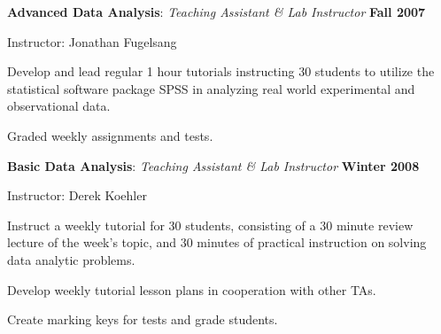 \documentclass[10pt]{article}
\newenvironment{outerlist}[1][\enskip\textbullet]%
        {\begin{enumerate}[#1]}{\end{enumerate}%
         \vspace{-.6\baselineskip}}
\newenvironment{innerlist}[1][\enskip\textbullet]%
        {\begin{compactenum}[#1]}{\end{compactenum}}
\begin{document}
\begin{outerlist}

\item[] \textbf{Advanced Data Analysis}: \textit{Teaching Assistant \& Lab Instructor}%
        \hfill \textbf{Fall 2007}
\begin{innerlist}
\item Instructor: Jonathan Fugelsang
\item Develop and lead regular 1 hour tutorials instructing 30 students to utilize the statistical software package SPSS in analyzing real world experimental and observational data.
\item Graded weekly assignments and tests.
\end{innerlist}

\item[] \textbf{Basic Data Analysis}: \textit{Teaching Assistant \& Lab Instructor}
        \hfill \textbf{Winter 2008}
\begin{innerlist}
\item Instructor: Derek Koehler
\item Instruct a weekly tutorial for 30 students, consisting of a 30 minute review lecture of the week's topic, and 30 minutes of practical instruction on solving data analytic problems.
\item Develop weekly tutorial lesson plans in cooperation with other TAs.
\item Create marking keys for tests and grade students.
\end{innerlist}


\end{outerlist}
\end{document}
